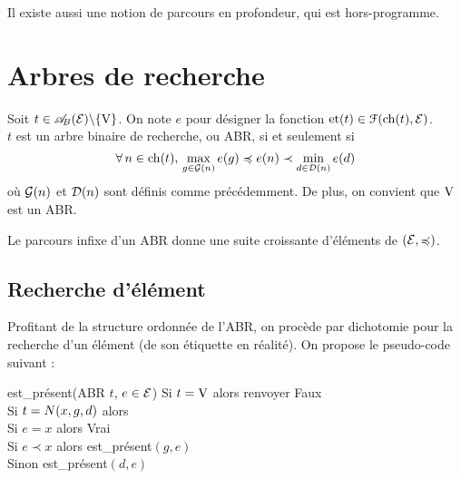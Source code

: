 		\begin{Remarque}
			Il existe aussi une notion de parcours en profondeur, qui est hors-programme.
		\end{Remarque}
	
\section{Arbres de recherche}

	
	\pagebreak
	
	\begin{Definition}
		Soit \(t\in\ABE\backslash\{\V\}\). On note \(e\) pour désigner la fonction \(\et(t) \in \EuScript{F}(\ch(t),\cal{E})\). \\
		\(t\) est un arbre binaire de recherche, ou ABR, si et seulement si
			\[
				\forall\,n\in\ch(t),\, \max_{g\in\cal{G}(n)} e(g) \preccurlyeq e(n) \prec \min_{d\in\cal{D}(n)} e(d)
			\]
		où \(\cal{G}(n)\) et \(\cal{D}(n)\) sont définis comme précédemment. \nt
		De plus, on convient que \(\V\) est un ABR.
	\end{Definition}
	
	\begin{Remarque}
		Le parcours infixe d'un ABR donne une suite croissante d'éléments de \((\cal{E},\preccurlyeq)\).
	\end{Remarque}
	
	\subsection{Recherche d'élément}
	
		Profitant de la structure ordonnée de l'ABR, on procède par dichotomie pour la recherche d'un élément (de son étiquette en réalité). On propose le pseudo-code suivant :
		
		\begin{pscode}{est\_présent}{(ABR \(t\), \(e \in \cal{E}\))}{}{}
			Si \(t = \V\) alors renvoyer Faux \\
			Si \(t = \N(x,g,d)\) alors \\ \Indp
				Si \(e=x\) alors Vrai \\
				Si \(e\prec x\) alors \textsf{est\_présent}\((g,e)\) \\
				Sinon \textsf{est\_présent}\((d,e)\)
		\end{pscode}
		
